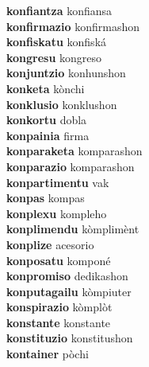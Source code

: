 \textbf{konfiantza } konfiansa \\
\textbf{konfirmazio } konfirmashon \\
\textbf{konfiskatu } konfiská \\
\textbf{kongresu } kongreso \\
\textbf{konjuntzio } konhunshon \\
\textbf{konketa } kònchi \\
\textbf{konklusio } konklushon \\
\textbf{konkortu } dobla \\
\textbf{konpainia } firma \\
\textbf{konparaketa } komparashon \\
\textbf{konparazio } komparashon \\
\textbf{konpartimentu } vak \\
\textbf{konpas } kompas \\
\textbf{konplexu } kompleho \\
\textbf{konplimendu } kòmplimènt \\
\textbf{konplize } acesorio \\
\textbf{konposatu } komponé \\
\textbf{konpromiso } dedikashon \\
\textbf{konputagailu } kòmpiuter \\
\textbf{konspirazio } kòmplòt \\
\textbf{konstante } konstante \\
\textbf{konstituzio } konstitushon \\
\textbf{kontainer } pòchi \\
